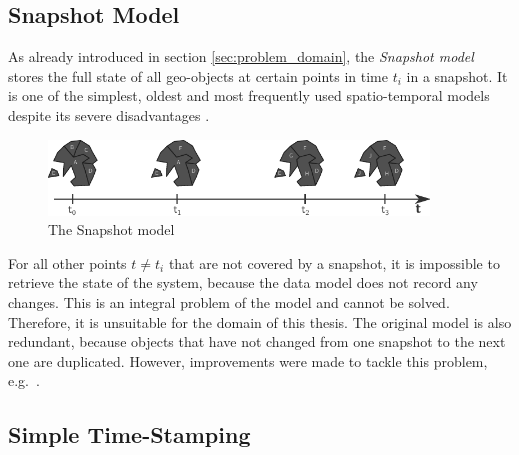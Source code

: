 
\subsection{Snapshot Model} %
\label{sub:snapshot_model}

As already introduced in section \ref{sec:problem_domain}, the \emph{Snapshot model} stores the full state of all geo-objects at certain points in time $t_i$ in a snapshot. It is one of the simplest, oldest and most frequently used spatio-temporal models despite its severe disadvantages
\cite{Langran1988frameworktgis}.

\begin{figure}[H]
  \vspace{1em}
  \centering
  \includegraphics[width=0.9\textwidth]{graphics/basics/stdm/snapshot_model}
  \caption{The Snapshot model \cite{Langran1988frameworktgis}}
  \label{fig:snapshot_model}
\end{figure}

For all other points $t \neq t_i$ that are not covered by a snapshot, it is impossible to retrieve the state of the system, because the data model does not record any changes. This is an integral problem of the model and cannot be solved. Therefore, it is unsuitable for the domain of this thesis. The original model is also redundant, because objects that have not changed from one snapshot to the next one are duplicated. However, improvements were made to tackle this problem, e.g.\ \cite{armenakis92}.


\subsection{Simple Time-Stamping} %
\label{sub:simple_time_stamping}

